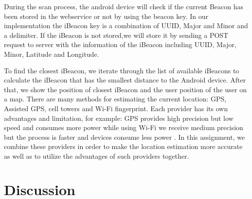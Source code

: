 \documentclass{sigchi}
\begin{document}
During the scan process, the android device will check if the current Beacon has been stored in the webservice or not by using the beacon key.
In our implementation the iBeacon key is a combination of UUID, Major and Minor and a delimiter.
If the iBeacon is not stored,we will store it by sending a POST request to server with the information of the iBeacon including UUID, Major, Minor, Latitude and Longitude.

To find the closest iBeacon, we iterate through the list of available iBeacons to calculate the iBeacon that has the smallest distance to the Android device. After that, we show the position of closest iBeacon and the user position of the user on a map.
There are many methods for estimating the current location: GPS, Assisted GPS, cell towers and Wi-Fi fingerprint.
Each provider has its own advantages and limitation, for example: GPS provides high precision but low speed and consumes more power while using Wi-Fi we receive medium precision but the process is faster and devices consume less power \cite{LaMarca:2008:LS, Constandache:2010:TMPLWWD}.
In this assignment, we combine these providers in order to make the location estimation more accurate as well as to utilize the advantages of such providers together. 
\section{Discussion}

%
%
%
%
%
\balance
\end{document}
